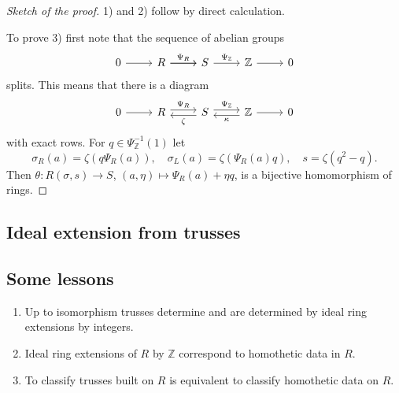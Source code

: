 \documentclass{svmult}
\newcommand{\Z}{\mathbb{Z}}
\begin{document}
\begin{proof}[Sketch of the proof]
    1) and 2) follow by direct calculation. 
    
    To prove 3) first note that
    the sequence of abelian groups 
    \[
    \begin{tikzcd}
	    {0} & {R} & {S} & {\Z} & {0}
	    \arrow["{\Psi_R}", from=1-2, to=1-3]
	    \arrow[from=1-1, to=1-2]
	    \arrow[from=1-2, to=1-3]
	    \arrow["{\Psi_{\Z}}", from=1-3, to=1-4]
	    \arrow[from=1-4, to=1-5]
    \end{tikzcd}
    \]
    splits. This means that there is a diagram 
\[\begin{tikzcd}
	0 & R & S & {\mathbb{Z}} & 0
	\arrow[from=1-1, to=1-2]
	\arrow[from=1-4, to=1-5]
	\arrow["{\Psi_{\mathbb{Z}}}", shift left=1, from=1-3, to=1-4]
	\arrow["{\Psi_R}", shift left=1, from=1-2, to=1-3]
	\arrow["{\kappa }", shift left=1, from=1-4, to=1-3]
	\arrow["{\zeta }", shift left=1, from=1-3, to=1-2]
\end{tikzcd}\]
    with exact rows. For $q\in\Psi_{\Z}^{-1}(1)$ let 
    \[
    \sigma_R(a)=\zeta(q\Psi_R(a)),
    \quad
    \sigma_L(a)=\zeta(\Psi_R(a)q),
    \quad
    s=\zeta(q^2-q).
    \]
    Then $\theta\colon R(\sigma,s)\to S$, $(a,\eta)\mapsto \Psi_R(a)+\eta q$, 
    is a bijective homomorphism of rings. 
\end{proof}

\subsection{Ideal extension from trusses}
\subsection{Some lessons}

\begin{enumerate}
    \item Up to isomorphism trusses determine and are determined by ideal ring
    extensions by integers.
    \item Ideal ring extensions of $R$ by $\Z$ correspond to homothetic data in $R$. 
    \item To classify trusses built on $R$ is equivalent to classify homothetic data on $R$. 
\end{enumerate}

\begin{example}

\end{example}
\end{document}
